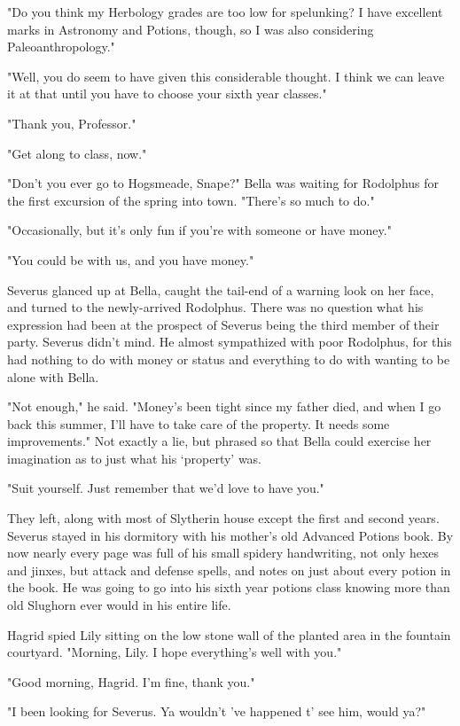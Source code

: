\documentclass[a4paper,11pt]{article}
\begin{document}
"Do you think my Herbology grades are too low for spelunking? I have excellent marks in Astronomy and Potions, though, so I was also considering Paleoanthropology."

"Well, you do seem to have given this considerable thought. I think we can leave it at that until you have to choose your sixth year classes."

"Thank you, Professor."

"Get along to class, now."

"Don't you ever go to Hogsmeade, Snape?" Bella was waiting for Rodolphus for the first excursion of the spring into town. "There's so much to do."

"Occasionally, but it's only fun if you're with someone or have money."

"You could be with us, and you have money."

Severus glanced up at Bella, caught the tail-end of a warning look on her face, and turned to the newly-arrived Rodolphus. There was no question what his expression had been at the prospect of Severus being the third member of their party. Severus didn't mind. He almost sympathized with poor Rodolphus, for this had nothing to do with money or status and everything to do with wanting to be alone with Bella.

"Not enough," he said. "Money's been tight since my father died, and when I go back this summer, I'll have to take care of the property. It needs some improvements." Not exactly a lie, but phrased so that Bella could exercise her imagination as to just what his `property' was.

"Suit yourself. Just remember that we'd love to have you."

They left, along with most of Slytherin house except the first and second years. Severus stayed in his dormitory with his mother's old Advanced Potions book. By now nearly every page was full of his small spidery handwriting, not only hexes and jinxes, but attack and defense spells, and notes on just about every potion in the book. He was going to go into his sixth year potions class knowing more than old Slughorn ever would in his entire life.

Hagrid spied Lily sitting on the low stone wall of the planted area in the fountain courtyard. "Morning, Lily. I hope everything's well with you."

"Good morning, Hagrid. I'm fine, thank you."

"I been looking for Severus. Ya wouldn't 've happened t' see him, would ya?"
\end{document}
